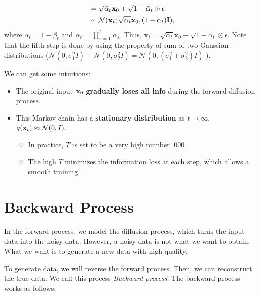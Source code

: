 \begin{itemize}
\begin{align}
						   &= \sqrt{\bar{\alpha}_t} \mathbf{x}_{0}+ \sqrt{1-\bar{\alpha}_t} \odot \epsilon\\
	&\sim \mathcal{N}(\mathbf{x}_t; \sqrt{\bar{\alpha}_t} {\mathbf{x}}_{0}, (1-\bar{\alpha}_t)\mathbf{I}),
	\label{eq:diffusion_forward_sampling}
\end{align}
			where $\alpha_t = 1-\beta_t$ and $\bar{\alpha}_t = \prod_{s=1}^t \alpha_s$. Thus, $\mathbf{x}_t= \sqrt{\bar{\alpha}_t} \mathbf{x}_{0}+ \sqrt{1-\bar{\alpha}_t} \odot \epsilon$. Note that the fifth step is done by using the property of sum of two Gaussian distributions (\eg $\mathcal{N}(0, \sigma_1^2I)+\mathcal{N}(0, \sigma_2^2I) = \mathcal{N}(0, (\sigma_1^2+\sigma_2^2)I)$ ). 
\end{itemize}

We can get some intuitions:
\begin{itemize}
	\item The original input ${\mathbf{x}}_0$ \textbf{gradually loses all info} during the forward diffusion process.
	\item This Markov chain has a \textbf{stationary distribution} \ie as $t\to \infty$, $q({\mathbf{x}}_t) \approx \mathcal{N}(0,I)$.
		\begin{itemize}
			\item In practice, $T$ is set to be a very high number ,000.
			\item The high $T$ minimizes the information loss at each step, which allows a smooth training.
		\end{itemize}
\end{itemize}

\section{Backward Process}

In the forward process, we model the diffusion process, which turns the input data into the noisy data. However, a noisy data is not what we want to obtain. What we want is to generate a new data with high quality.

To generate data, we will reverse the forward process. Then, we can reconstruct the true data. We call this process \textit{Backward process}! The backward process works as follows:

